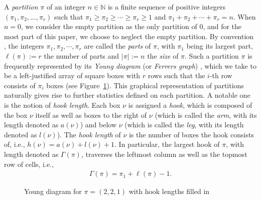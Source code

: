 \documentclass[12pt]{amsart}
\numberwithin{equation}{section}
\theoremstyle{plain}
\theoremstyle{definition}
\newcommand{\N}{\mathbb{N}}
\begin{document}
A \emph{partition} \cite{Andr} $\pi$ of an integer $n\in\N$ is a finite sequence of positive integers $(\pi_{1}, \pi_{2}, \ldots, \pi_{r})$ such that $\pi_{1}\geq \pi_{2}\geq\cdots\geq \pi_{r}\geq 1$ and $\pi_{1}+\pi_{2}+\cdots+\pi_{r}=n$. When $n=0$, we consider the empty partition as the only partition of $0$, and for the most part of this paper, we choose to neglect the empty partition. By convention \cite{Andr}, the integers $\pi_{1}, \pi_{2}, \cdots, \pi_{r}$ are called the \emph{parts} of $\pi$, with $\pi_{1}$ being its largest part, $\ell(\pi):=r$ the number of parts and $|\pi|:=n$ the \emph{size} of $\pi$. Such a partition $\pi$ is frequently represented by its \emph{Young diagram} (or \emph{Ferrers graph}) \cite[Chapter 1.3]{Andr}, which we take to be a left-justified array of square boxes with $r$ rows such that the $i$-th row consists of $\pi_{i}$ boxes (see Figure~\ref{yd}). This graphical representation of partitions naturally gives rise to further statistics defined on each partition. A notable one is the notion of \emph{hook length}. Each box $\nu$ is assigned a \emph{hook}, which is composed of the box $\nu$ itself as well as boxes to the right of $\nu$ (which is called the \emph{arm}, with its length denoted as $a(\nu)$) and below $\nu$ (which is called the \emph{leg}, with its length denoted as $l(\nu)$). The \emph{hook length} of $\nu$ is the number of boxes the hook consists of, i.e., $h(\nu)=a(\nu)+l(\nu)+1$. In particular, the largest hook of $\pi$, with length denoted as $\Gamma(\pi)$, traverses the leftmost column as well as the topmost row of cells, i.e.,
\begin{align}\label{Gamma}
\Gamma(\pi)=\pi_1+\ell(\pi)-1.
\end{align}


\begin{figure}
\caption{Young diagram for $\pi=(2,2,1)$ with hook lengths filled in}
\label{yd}
\end{figure}
\end{document}

